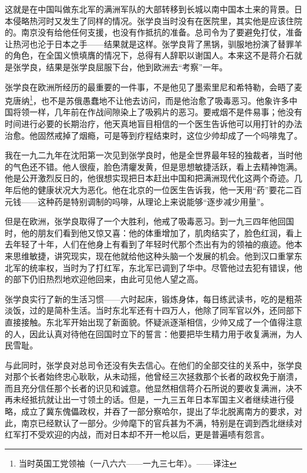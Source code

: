 \documentclass[10pt]{book}
\begin{document}
这就是在中国叫做东北军的满洲军队的大部转移到长城以南中国本土来的背景。日本侵略热河时又发生了同样的情况。张学良当时没有在医院里，其实他是应该住院的。南京没有给他任何支援，也没有作抵抗的准备。总司令为了要避免打仗，准备让热河也沦于日本之手——结果就是这样。张学良背了黑锅，驯服地扮演了替罪羊的角色，在全国义愤填膺的情况下，总得有人辞职以谢国人。本来这不是蒋介石就是张学良，结果是张学良屈服下台，他到欧洲去“考察”一年。

张学良在欧洲所经历的最重要的一件事，不是他见了墨索里尼和希特勒，会晤了麦克唐纳\footnote{当时英国工党领袖（一八六六——一九三七年）。——译注}，也不是苏俄愚蠢地不让他去访问，而是他治愈了吸毒恶习。他象许多中国将领一样，几年前在作战间隙染上了吸鸦片的恶习。要戒烟不是件易事；他没有时间进行必要的长期治疗，他天真地盲目相信的一个医生告诉他可以用打针的办法治愈。他固然戒掉了烟瘾，可是等到疗程结束时，这位少帅却成了一个吗啡鬼了。

我在一九二九年在沈阳第一次见到张学良时，他是全世界最年轻的独裁者，当时他的气色还不错。他人很瘦，脸色清癯发黄，但是思想敏捷活跃，看上去精神饱满。他是公开激烈反日的，他很想实现把日本赶出中国和把满洲现代化这两个奇迹。几年后他的健康状况大为恶化。他在北京的一位医生告诉我，他一天用“药”要花二百元钱——这种药是特别调制的吗啡，从理论上来说能够“逐步减少用量”。

但是在欧洲，张学良取得了一个大胜利，他戒了吸毒恶习。到一九三四年他回国时，他的朋友们看到他又惊又喜：他的体重增加了，肌肉结实了，脸色红润，看上去年轻了十年，人们在他身上有看到了年轻时代那个杰出有为的领袖的痕迹。他本来思维敏捷，讲究现实，现在他就给他这种头脑一个发展的机会。他到汉口重掌东北军的统率权，当时为了打红军，东北军已调到了华中。尽管他过去犯有错误，他的部下仍旧热烈地欢迎他回来，由此可见他人望之高。

张学良实行了新的生活习惯——六时起床，锻炼身体，每日练武读书，吃的是粗茶淡饭，过的是简朴生活。当时东北军还有十四万人，他除了同军官以外，还同部下直接接触。东北军开始出现了新面貌。怀疑派逐渐相信，少帅又成了一个值得注意的人，因此认真对待他在回国时立下的誓言：他要把毕生精力用于收复满洲，为人民雪耻。

与此同时，张学良对总司令还没有失去信心。在他们的全部交往的关系中，张学良对那个长者始终忠心耿耿，从未动摇，他曾经三次拯救那个长者的政权免于崩溃，而且充分信任那个长者的识见和诚意。他显然相信蒋介石所说的要收复满洲，决不再未经抵抗就让出一寸领土的话。但是，一九三五年日本军国主义者继续进行侵略，成立了冀东傀儡政权，并吞了一部分察哈尔，提出了华北脱离南方的要求，对此，南京已经默认了一部分。少帅麾下的官兵甚为不满，特别是在调到西北继续对红军打不受欢迎的内战，而对日本却不开一枪以后，更是普遍啧有怨言。
\end{document}
